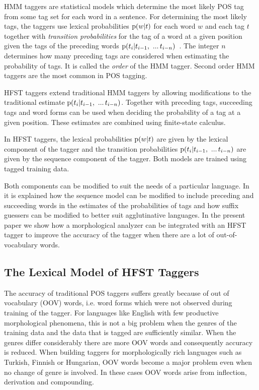 \documentclass[draft]{llncs}
\begin{document}
HMM taggers are statistical models which determine the most likely
POS tag from some tag set for each word in a sentence. For
determining the most likely tags, the taggers use
lexical probabilities ${\rm p}(w|t)$ for each word $w$ and each tag
$t$ together with \emph{transition probabilities} for the tag of a
word at a given position given the tags of the preceding words ${\rm
  p}(t_i | t_{i - 1},\ ...\, t_{i-n})$~\cite{silfverberg/2011/nodalida}. The integer $n$ determines how
many preceding tags are considered when estimating the probability of
tags. It is called the \emph{order} of the HMM tagger. Second order HMM
taggers are the most common in POS tagging.

HFST taggers extend traditional HMM taggers by allowing modifications
to the traditional estimate ${\rm p}(t_i | t_{i - 1},\ ...\,
t_{i-n})$. Together with preceding tags, succeeding tags and word
forms can be used when deciding the probability of a tag at a given
position. These estimates are combined using finite-state calculus.

In HFST taggers, the lexical probabilities ${\rm p}(w|t)$ are given by
the lexical component of the tagger and the transition probabilities
${\rm p}(t_i | t_{i - 1},\ ...\, t_{i-n})$ are given by the sequence
component of the tagger. Both models are trained using tagged
training data.

Both components can be modified to suit the needs of a particular
language. In~\cite{silfverberg/2011/nodalida} it is explained how the sequence
model can be modified to include preceding and succeeding words in
the estimates of the probabilities of tags and how suffix guessers
can be modified to better suit agglutinative languages. In the present paper
we show how a morphological analyzer can be integrated with an HFST
tagger to improve the accuracy of the tagger when there are a lot of
out-of-vocabulary words.


\subsection{The Lexical Model of HFST Taggers}

The accuracy of traditional POS taggers suffers greatly because of
out of vocabulary (OOV) words, i.e. word forms which were not
observed during training of the tagger. For languages like English
with few productive morphological phenomena, this is not a big problem
when the genres of the training data and the data that is tagged are
sufficiently similar. When the genres differ considerably there are
more OOV words and consequently accuracy is reduced. When building
taggers for morphologically rich languages such as Turkish, Finnish or
Hungarian, OOV words become a major problem even when no change of
genre is involved. In these cases OOV words arise from inflection,
derivation and compounding.
\end{document}
